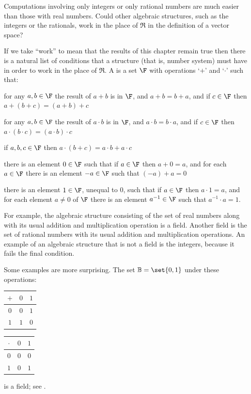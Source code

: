 Computations involving only integers or only rational numbers are much
easier than those with real numbers.
Could other algebraic structures, such as the integers or the rationals,
work in the
place of \( \Re \) in the definition of a vector space?

If we take ``work'' to mean that the results of this chapter
remain true
then there is a natural list of conditions that a structure 
(that is, number system)
must have in order to work in the place of $\Re$.
A  is a set 
\( \F \) with operations
`\( + \)'
and `\( \cdot \)' such that:
\begin{tfae}
   \item for any \( a,b\in\F \) the result of \( a+b \) is in \( \F \), and
         \( a+b=b+a \), and
         if \( c\in\F \) then \( a+(b+c)=(a+b)+c \)
   \item for any \( a,b\in\F \) the result of \( a\cdot b \) is in \( \F \), and
         \( a\cdot b=b\cdot a \), and
         if \( c\in\F \) then \( a\cdot (b\cdot c)=(a\cdot b)\cdot c \)
   \item if \( a,b,c\in\F \) then \( a\cdot (b+c)=a\cdot b+a\cdot c \)
   \item there is an element \( 0\in\F \) such that
         if \( a\in\F \) then \( a+0=a \), and
         for each \( a\in\F \) there is an element \( -a\in\F \)
                such that \( (-a)+a=0 \)
   \item there is an element \( 1\in\F \), unequal to $0$, such that
         if \( a\in\F \) then \( a\cdot 1=a \), and
         for each element \( a\neq 0 \) of \( \F \)
                there is an element \( a^{-1}\in\F \)
                such that \( a^{-1}\cdot a=1 \).
\end{tfae}

For example, the algebraic structure 
consisting of the set of real numbers along with its usual
addition and multiplication operation is a field.
Another field is the set of rational numbers with its usual addition
and multiplication operations.
An example of an algebraic structure that is not a field is
the integers, because it fails the final condition.

Some examples are more surprising.
The set \( \mathbb{B}=\set{0,1} \) under these operations:
\begin{center}
  \begin{tabular}{c|cc}
    \( + \) &\( 0 \) &\( 1 \) \\
    \hline
    \( 0 \) &\( 0 \) &\( 1 \) \\
    \( 1 \) &\( 1 \) &\( 0 \)
  \end{tabular}
  \qquad
  \begin{tabular}{c|cc}
    \( \cdot \) &\( 0 \) &\( 1 \) \\
     \hline
       \( 0 \)  &\( 0 \) &\( 0 \)  \\
       \( 1 \)  &\( 0 \) &\( 1 \)
  \end{tabular}
\end{center}
is a field; see .

